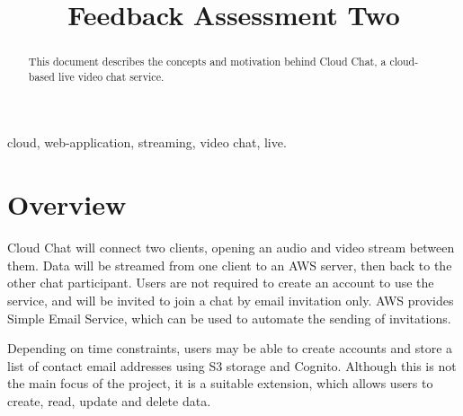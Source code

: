 \documentclass[conference]{IEEEtran}
\begin{document}
\title{Feedback Assessment Two\\}

\author{
}

\maketitle

\begin{abstract}
This document describes the concepts and motivation behind Cloud Chat, a cloud-based live video chat service.
\end{abstract}
\begin{IEEEkeywords}
cloud, web-application, streaming, video chat, live.
\end{IEEEkeywords}
\section{Overview}
Cloud Chat will connect two clients, opening an audio and video stream between them. Data will be streamed from one client to an AWS server, then back to the other chat participant. Users are not required to create an account to use the service, and will be invited to join a chat by email invitation only. AWS provides Simple Email Service, which can be used to automate the sending of invitations.
\par
Depending on time constraints, users may be able to create accounts and store a list of contact email addresses using S3 storage and Cognito. Although this is not the main focus of the project, it is a suitable extension, which allows users to create, read, update and delete data. 
\end{document}
